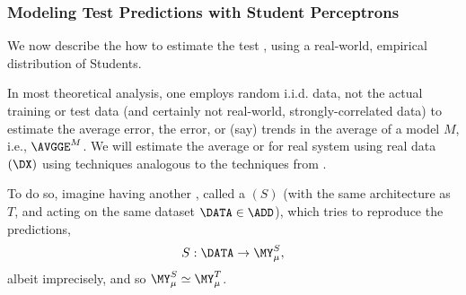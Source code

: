 \subsubsection{Modeling Test Predictions with Student Perceptrons}

We now describe the how to estimate the \Teacher test \GeneralizationError, using a real-world, empirical distribution of Students.

In most theoretical analysis, one employs random i.i.d. data, not the actual training or test data (and certainly not real-world, strongly-correlated data) to estimate the average error, the \Typical error, or (say) trends in the average \GeneralizationError of a model $M$, i.e., $\AVGGE^{M}$.
We will estimate the average or \Typical \GeneralizationError for real system using real data  $(\DX)$ using techniques analogous to the techniques from \STATMECH.

To do so, imagine having another \Perceptron, 
called a \Student $(S)$ (with the same architecture as $T$, and acting on the same  
dataset $\DATA\in\ADD$), which tries to  reproduce the \Teacher predictions,
\begin{align}
S:\DATA\rightarrow \MY^{S}_{\mu}  ,
\end{align}
albeit imprecisely, and so $\MY^{S}_{\mu}\simeq \MY^{T}_{\mu}$. 

